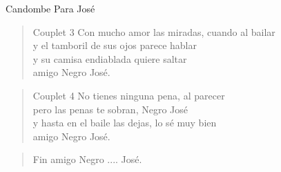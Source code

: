 \begin{song}[vals]{Candombe Para José}
\begin{verse}{Couplet 3}
Con mucho amor las miradas, cuando al bailar\\
y el tamboril de sus ojos parece hablar\\
y su camisa endiablada quiere saltar\\
amigo Negro José.  \hspace{1em}\\
\end{verse}

\begin{verse}{Couplet 4}
No tienes ninguna pena, al parecer\\
pero las penas te sobran, Negro José\\
y hasta en el baile las dejas, lo sé muy bien\\
amigo Negro José.  \hspace{1em}\\
\end{verse}

\begin{verse}{Fin}
amigo Negro .... José. \hspace{.5em} \\
\end{verse}



\end{song}
